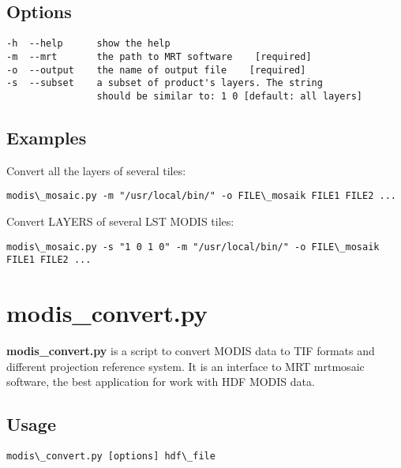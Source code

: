 \documentclass[a4paper,11pt,oneside]{sphinxmanual}
\begin{document}
\subsection{Options}
\label{scripts/modis_mosaic:options}
\begin{Verbatim}[commandchars=\\\{\}]
-h  --help      show the help
-m  --mrt       the path to MRT software    [required]
-o  --output    the name of output file    [required]
-s  --subset    a subset of product's layers. The string
                should be similar to: 1 0 [default: all layers]
\end{Verbatim}


\subsection{Examples}
\label{scripts/modis_mosaic:examples}
Convert all the layers of several tiles:

\begin{Verbatim}[commandchars=\\\{\}]
modis\_mosaic.py -m "/usr/local/bin/" -o FILE\_mosaik FILE1 FILE2 ...
\end{Verbatim}

Convert LAYERS of several LST MODIS tiles:

\begin{Verbatim}[commandchars=\\\{\}]
modis\_mosaic.py -s "1 0 1 0" -m "/usr/local/bin/" -o FILE\_mosaik FILE1 FILE2 ...
\end{Verbatim}
\newpage %

\section{modis\_convert.py}
\label{scripts/modis_convert:modis-convert-py}\label{scripts/modis_convert::doc}
\textbf{modis\_convert.py} is a script to convert MODIS data to TIF formats and
different projection reference system. It is an interface to MRT mrtmosaic
software, the best application for work with HDF MODIS data.


\subsection{Usage}
\label{scripts/modis_convert:usage}
\begin{Verbatim}[commandchars=\\\{\}]
modis\_convert.py [options] hdf\_file
\end{Verbatim}
\end{document}
